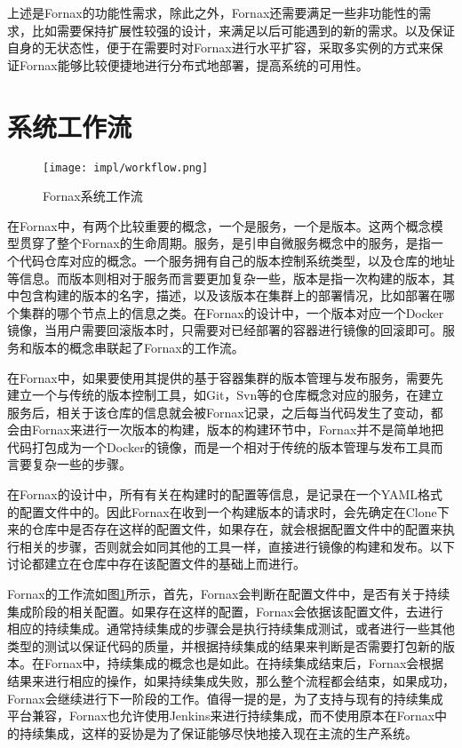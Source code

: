 上述是Fornax的功能性需求，除此之外，Fornax还需要满足一些非功能性的需求，比如需要保持扩展性较强的设计，来满足以后可能遇到的新的需求。以及保证自身的无状态性，便于在需要时对Fornax进行水平扩容，采取多实例的方式来保证Fornax能够比较便捷地进行分布式地部署，提高系统的可用性。

\section{系统工作流}

\begin{figure}[!htp]
  \centering
  \texttt{[image: impl/workflow.png]}
  \caption{Fornax系统工作流}
  \label{fig:workflow}
\end{figure}

在Fornax中，有两个比较重要的概念，一个是服务，一个是版本。这两个概念模型贯穿了整个Fornax的生命周期。服务，是引申自微服务概念中的服务，是指一个代码仓库对应的概念。一个服务拥有自己的版本控制系统类型，以及仓库的地址等信息。而版本则相对于服务而言要更加复杂一些，版本是指一次构建的版本，其中包含构建的版本的名字，描述，以及该版本在集群上的部署情况，比如部署在哪个集群的哪个节点上的信息之类。在Fornax的设计中，一个版本对应一个Docker镜像，当用户需要回滚版本时，只需要对已经部署的容器进行镜像的回滚即可。服务和版本的概念串联起了Fornax的工作流。

在Fornax中，如果要使用其提供的基于容器集群的版本管理与发布服务，需要先建立一个与传统的版本控制工具，如Git，Svn等的仓库概念对应的服务，在建立服务后，相关于该仓库的信息就会被Fornax记录，之后每当代码发生了变动，都会由Fornax来进行一次版本的构建，版本的构建环节中，Fornax并不是简单地把代码打包成为一个Docker的镜像，而是一个相对于传统的版本管理与发布工具而言要复杂一些的步骤。

在Fornax的设计中，所有有关在构建时的配置等信息，是记录在一个YAML格式的配置文件中的。因此Fornax在收到一个构建版本的请求时，会先确定在Clone下来的仓库中是否存在这样的配置文件，如果存在，就会根据配置文件中的配置来执行相关的步骤，否则就会如同其他的工具一样，直接进行镜像的构建和发布。以下讨论都建立在仓库中存在该配置文件的基础上而进行。

Fornax的工作流如图\ref{fig:workflow}所示，首先，Fornax会判断在配置文件中，是否有关于持续集成阶段的相关配置。如果存在这样的配置，Fornax会依据该配置文件，去进行相应的持续集成。通常持续集成的步骤会是执行持续集成测试，或者进行一些其他类型的测试以保证代码的质量，并根据持续集成的结果来判断是否需要打包新的版本。在Fornax中，持续集成的概念也是如此。在持续集成结束后，Fornax会根据结果来进行相应的操作，如果持续集成失败，那么整个流程都会结束，如果成功，Fornax会继续进行下一阶段的工作。值得一提的是，为了支持与现有的持续集成平台兼容，Fornax也允许使用Jenkins来进行持续集成，而不使用原本在Fornax中的持续集成，这样的妥协是为了保证能够尽快地接入现在主流的生产系统。

